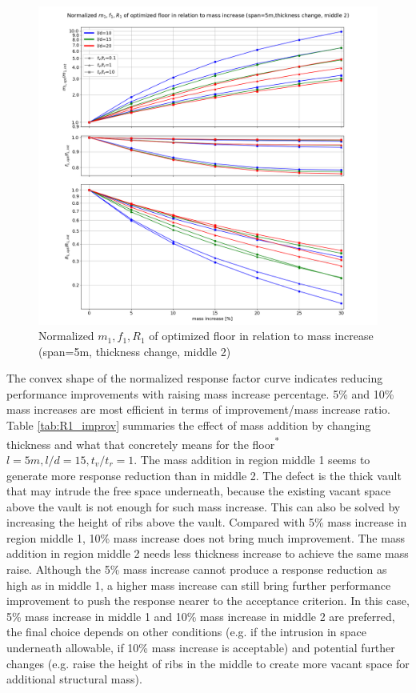 \begin{figure}[H]
\centering
\includegraphics[width=.99\textwidth]{images/mass_inc_thickness_middle2.png}
\caption{Normalized $m_1,f_1,R_1$ of optimized floor in relation to mass increase (span=5m, thickness change, middle 2)}
\label{fig:mass_inc_thickness_middle2}
\end{figure}

The convex shape of the normalized response factor curve indicates reducing performance improvements with raising mass increase percentage. 5\% and 10\% mass increases are most efficient in terms of improvement/mass increase ratio. Table \ref{tab:R1_improv} summaries the effect of mass addition by changing thickness and what that concretely means for the floor\textsuperscript{*} $l=5m, l/d=15, t_v/t_r=1$. The mass addition in region middle 1 seems to generate more response reduction than in middle 2. The defect is the thick vault that may intrude the free space underneath, because the existing vacant space above the vault is not enough for such mass increase. This can also be solved by increasing the height of ribs above the vault. Compared with 5\% mass increase in region middle 1, 10\% mass increase does not bring much improvement. The mass addition in region middle 2 needs less thickness increase to achieve the same mass raise. Although the 5\% mass increase cannot produce a response reduction as high as in middle 1, a higher mass increase can still bring further performance improvement to push the response nearer to the acceptance criterion. In this case, 5\% mass increase in middle 1 and 10\% mass increase in middle 2 are preferred, the final choice depends on other conditions (e.g. if the intrusion in space underneath allowable, if 10\% mass increase is acceptable) and potential further changes (e.g. raise the height of ribs in the middle to create more vacant space for additional structural mass).

